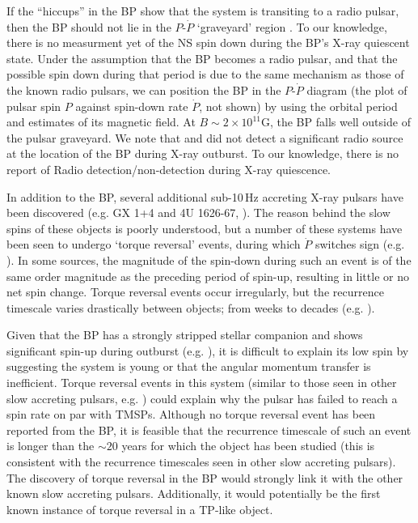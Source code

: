 \par If the ``hiccups'' in the BP show that the system is transiting to a radio pulsar, then the BP should not lie in the $P$-$\dot{P}$ `graveyard' region \citep[e.g.][]{vandenHeuvel_Graveyard}. To our knowledge, there is no measurment yet of the NS spin down during the BP's X-ray quiescent state. Under the assumption that the BP becomes a radio pulsar, and that the possible spin down during that period is due to the same mechanism as those of the known radio pulsars, we can position the BP in the $P$-$\dot{P}$ diagram (the plot of pulsar spin $P$ against spin-down rate $\dot{P}$, not shown) by using the orbital period and estimates of its magnetic field. At $B\sim2\times10^{11}$G, the BP falls well outside of the pulsar graveyard. We note that \citet{Pandey-Pommier_BPRad} and \citet{Russell_BPRad} did not detect a significant radio source at the location of the BP during X-ray outburst. To our knowledge, there is no report of Radio detection/non-detection during X-ray quiescence.

\par In addition to the BP, several additional sub-10\,Hz accreting X-ray pulsars have been discovered (e.g. GX 1+4 and 4U 1626-67, \citealp{Lewin_GX1,Rappaport_4U}).  The reason behind the slow spins of these objects is poorly understood, but a number of these systems have been seen to undergo `torque reversal' events, during which $\dot{P}$ switches sign (e.g. \citealp{Chakrabarty_4U,Chakrabarty_GX14}).  In some sources, the magnitude of the spin-down during such an event is of the same order magnitude as the preceding period of spin-up, resulting in little or no net spin change.  Torque reversal events occur irregularly, but the recurrence timescale varies drastically between objects; from weeks to decades (e.g. \citealp{Bildsten_Rev}).

\par Given that the BP has a strongly stripped stellar companion \citep{Bildsten_Nuclear} and shows significant spin-up during outburst (e.g. \citealp{Finger_BP,Sanna_BP}), it is difficult to explain its low spin by suggesting the system is young or that the angular momentum transfer is inefficient.  Torque reversal events in this system (similar to those seen in other slow accreting pulsars, e.g. \citealp{Bildsten_Rev}) could explain why the pulsar has failed to reach a spin rate on par with TMSPs.  Although no torque reversal event has been reported from the BP, it is feasible that the recurrence timescale of such an event is longer than the $\sim20$ years for which the object has been studied (this is consistent with the recurrence timescales seen in other slow accreting pulsars).  The discovery of torque reversal in the BP would strongly link it with the other known slow accreting pulsars.  Additionally, it would potentially be the first known instance of torque reversal in a TP-like object.

